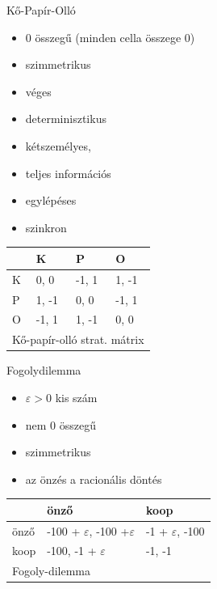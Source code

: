 	\begin{definition}{Kő-Papír-Olló}{}
		\begin{itemize}
			\item 0 összegű (minden cella összege 0)
			\item szimmetrikus
			\item véges
			\item determinisztikus
			\item kétszemélyes,
			\item teljes információs
			\item egylépéses
			\item szinkron
		\end{itemize}
	\end{definition}
	
	\begin{center}
		\begin{tabular}{llll}
			\hline
			\multicolumn{1}{|l|}{}  & \multicolumn{1}{l|}{K}     & \multicolumn{1}{l|}{P}     & \multicolumn{1}{l|}{O}     \\ \hline
			\multicolumn{1}{|l|}{K} & \multicolumn{1}{l|}{0, 0}  & \multicolumn{1}{l|}{-1, 1} & \multicolumn{1}{l|}{1, -1} \\ \hline
			\multicolumn{1}{|l|}{P} & \multicolumn{1}{l|}{1, -1} & \multicolumn{1}{l|}{0, 0}  & \multicolumn{1}{l|}{-1, 1} \\ \hline
			\multicolumn{1}{|l|}{O} & \multicolumn{1}{l|}{-1, 1} & \multicolumn{1}{l|}{1, -1} & \multicolumn{1}{l|}{0, 0}  \\ \hline
			\multicolumn{4}{l}{Kő-papír-olló strat. mátrix}                                                               
		\end{tabular}
	\end{center}
	
	
	
	\begin{definition}{Fogolydilemma}{}
		\begin{itemize}
			\item $\varepsilon > 0 $ kis szám
			\item nem 0 összegű
			\item szimmetrikus
			\item az önzés a racionális döntés
		\end{itemize}
	\end{definition}
	
	\begin{center}
		\begin{tabular}{lll}
			\hline
			\multicolumn{1}{|l|}{}     & \multicolumn{1}{l|}{önző}              & \multicolumn{1}{l|}{koop}         \\ \hline
			\multicolumn{1}{|l|}{önző} & \multicolumn{1}{l|}{-100 + $\varepsilon$, -100 +$\varepsilon$} & \multicolumn{1}{l|}{-1 + $\varepsilon$, -100} \\ \hline
			\multicolumn{1}{|l|}{koop}    & \multicolumn{1}{l|}{-100, -1 + $\varepsilon$}      & \multicolumn{1}{l|}{-1, -1}       \\ \hline
			\multicolumn{3}{l}{Fogoly-dilemma}                                                                     
		\end{tabular}
	\end{center}
	
